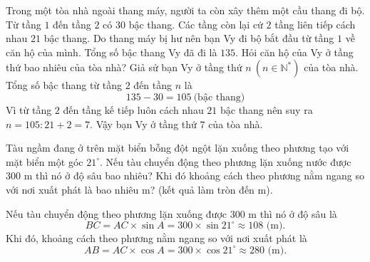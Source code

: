 	\begin{ex}%
		Trong một tòa nhà ngoài thang máy, người ta còn xây thêm một cầu thang đi bộ. Từ tầng $1$ đến tầng $2$ có $30$ bậc thang. Các tầng còn lại cứ $2$ tầng liên tiếp cách nhau $21$ bậc thang. Do thang máy bị hư nên bạn Vy đi bộ bắt đầu từ tầng $1$ về căn hộ của mình. Tổng số bậc thang Vy đã đi là $135$. Hỏi căn hộ của Vy ở tầng thứ bao nhiêu của tòa nhà?
		\loigiai
		{
			Giả sử bạn Vy ở tầng thứ $n~(n \in \mathbb{N}^*)$ của tòa nhà. Tổng số bậc thang từ tầng $2$ đến tầng $n$ là
			$$135-30=105~\text{(bậc thang)}$$
			Vì từ tầng $2$ đến tầng kế tiếp luôn cách nhau $21$ bậc thang nên suy ra $n=105:21+2=7$. Vậy bạn Vy ở tầng thứ $7$ của tòa nhà.
		}
	\end{ex}
	\begin{ex} Tàu ngầm đang ở trên mặt biển bỗng đột ngột lặn xuống theo phương tạo với mặt biển một góc $21^\circ$. Nếu tàu chuyển động theo phương lặn xuống nước được $300$ m thì nó ở độ sâu bao nhiêu? Khi đó khoảng cách theo phương nằm ngang so với nơi xuất phát là bao nhiêu m? (kết quả làm tròn đến m).
		\loigiai
		{
			\begin{center}
			\end{center}
			Nếu tàu chuyển động theo phương lặn xuống được $300$ m thì nó ở độ sâu là
			$$BC = AC \times \sin A = 300 \times \sin 21^\circ \approx 108 \text{ (m).}$$
			Khi đó, khoảng cách theo phương nằm ngang so với nơi xuất phát là
			$$AB = AC \times \cos A = 300 \times \cos 21^\circ \approx 280 \text{ (m).}$$
		}
	\end{ex}
	
